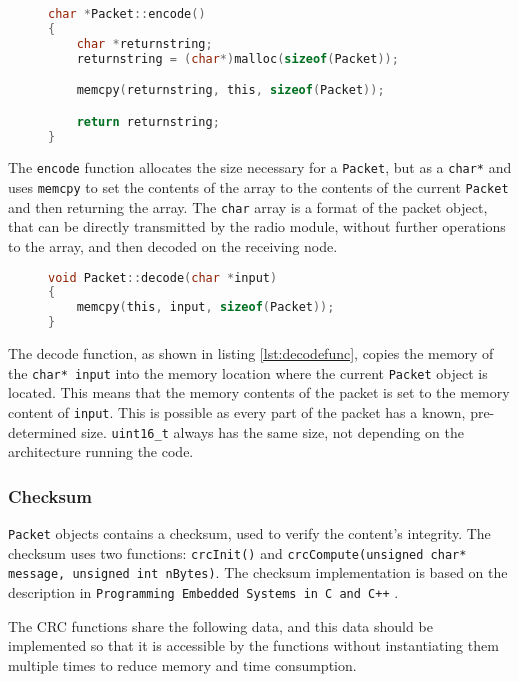 \begin{figure}
\begin{lstlisting}[language=C, caption={Packet encode function.}]
char *Packet::encode()
{
    char *returnstring;
    returnstring = (char*)malloc(sizeof(Packet));

    memcpy(returnstring, this, sizeof(Packet));

    return returnstring;
}
\end{lstlisting}
\end{figure}
The \texttt{encode} function allocates the size necessary for a \texttt{Packet}, but as a \texttt{char*} and uses \texttt{memcpy} to set the contents of the array to the contents of the current \texttt{Packet} and then returning the array. The \texttt{char} array is a format of the packet object, that can be directly transmitted by the radio module, without further operations to the array, and then decoded on the receiving node.

\begin{figure}
\begin{lstlisting}[language=C,label={lst:decodefunc},caption={Decode function.}]
void Packet::decode(char *input)
{
    memcpy(this, input, sizeof(Packet));
}
\end{lstlisting}
\end{figure}
The decode function, as shown in listing \ref{lst:decodefunc}, copies the memory of the \texttt{char* input} into the memory location where the current \texttt{Packet} object is located. This means that the memory contents of the packet is set to the memory content of \texttt{input}. This is possible as every part of the packet has a known, pre-determined size. \texttt{uint16\_t} always has the same size, not depending on the architecture running the code.

\subsubsection{Checksum}
\texttt{Packet} objects contains a checksum, used to verify the content's integrity. The checksum uses two functions: \texttt{crcInit()} and \texttt{crcCompute(unsigned char* message, unsigned int nBytes)}. The checksum implementation is based on the description in \texttt{Programming Embedded Systems in C and C++} \cite{crcCode}.

The CRC functions share the following data, and this data should be implemented so that it is accessible by the functions without instantiating them multiple times to reduce memory and time consumption.

